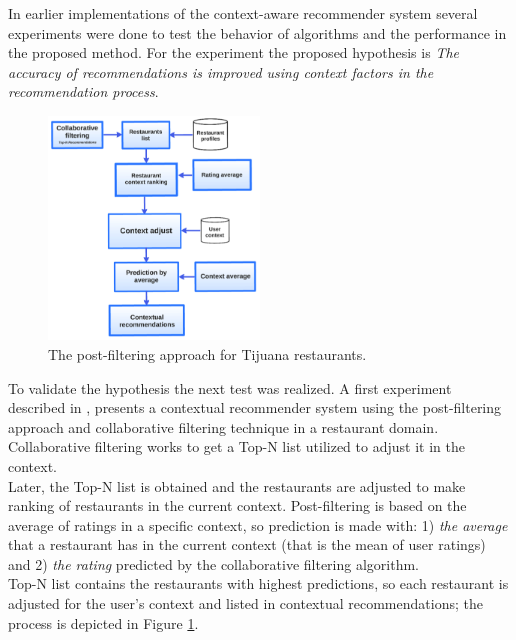 In earlier implementations of the context-aware recommender system  
several experiments were done to test the behavior of algorithms 
and the performance in the proposed method. 
For the experiment the proposed hypothesis is \textit{The accuracy of 
recommendations is improved using context factors in the 
recommendation process}. 
\begin{figure}
\centering
\captionsetup{font=footnotesize}
\setlength\fboxsep{0pt}
\includegraphics[width=0.50\textwidth]{img/posfil.png}
\caption{The post-filtering approach for Tijuana restaurants.}
\label{fig:postfiltering}     
\end{figure}
To validate the hypothesis the next test was realized.
A first experiment described in  \cite{ramirez2013restaurant}, presents a  
contextual recommender system using the post-filtering approach and 
collaborative filtering technique in a restaurant domain. 
Collaborative filtering works to get a Top-N list utilized to adjust it in 
the context. \\
Later, the Top-N list is obtained and the restaurants are adjusted to 
make ranking of restaurants  in the current context. Post-filtering is
based on the average  of ratings in a specific context, so prediction
is made with: 1) \textit{the average} that a restaurant has in the
current context (that is the  mean of user ratings) and 2)  
 \textit{the rating} predicted by the collaborative filtering algorithm.\\ 
Top-N list contains the restaurants with highest predictions, 
so each restaurant is adjusted for the user's context and listed in 
contextual recommendations; the process is depicted in 
Figure  \ref{fig:postfiltering}.

